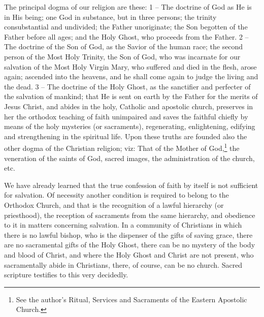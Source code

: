 The principal dogma of our religion are these: 
1 -- The doctrine of God as He is in His being; 
one God in substance, but in three persons; the 
trinity consubstantial and undivided; the Father 
unoriginate; the Son begotten of the Father before
all ages; and the Holy Ghost, who proceeds 
from the Father. 2 -- The doctrine of the Son 
of God, as the Savior of the human race; the 
second person of the Most Holy Trinity, the Son 
of God, who was incarnate for our salvation of 
the Most Holy Virgin Mary, who suffered and 
died in the flesh, arose again; ascended into the 
heavens, and he shall come again to judge the 
living and the dead. 3 -- The doctrine of the 
Holy Ghost, as the sanctifier and perfecter of 
the salvation of mankind; that He is sent on 
earth by the Father for the merits of Jesus 
Christ, and abides in the holy, Catholic and 
apostolic church, preserves in her the orthodox 
teaching of faith unimpaired and saves the faithful
chiefly by means of the holy mysteries (or 
sacraments), regenerating, enlightening, edifying
and strengthening in the spiritual life. 
Upon these truths are founded also the other 
dogma of the Christian religion; viz: That of 
the Mother of God,\footnote{See the author's Ritual,
Services and Sacraments of the Eastern Apostolic
Church.} the veneration of the saints of God,
sacred images, the administration of the church, etc. 

We have already learned that the true confession
of faith by itself is not sufficient for 
salvation. Of necessity another condition is 
required to belong to the Orthodox Church, and 
that is the recognition of a lawful hierarchy 
(or priesthood), the reception of sacraments 
from the same hierarchy, and obedience to it in 
matters concerning salvation. In a community
of Christians in which there is no lawful bishop,
who is the dispenser of the gifts of saving grace,
there are no sacramental gifts of the 
Holy Ghost, there can be no mystery of the body 
and blood of Christ, and where the Holy Ghost 
and Christ are not present, who sacramentally 
abide in Christians, there, of course, can be no 
church. Sacred scripture testifies to this very 
decidedly. 

